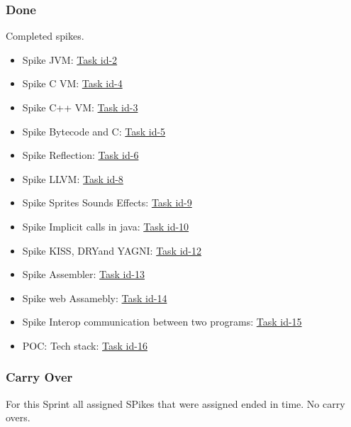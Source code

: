 \documentclass[a4paper,12pt]{article}
\begin{document}
\subsubsection{Done}
Completed spikes.
\begin{itemize}
    \item Spike JVM: \href{https://tree.taiga.io/project/joseluis-teran-coffeetime/us/2?milestone=390348}{Task id-2}
    \item Spike C VM: \href{https://tree.taiga.io/project/joseluis-teran-coffeetime/us/4?milestone=390348}{Task id-4}
    \item Spike C++ VM: \href{https://tree.taiga.io/project/joseluis-teran-coffeetime/us/3?milestone=390348}{Task id-3}
    \item Spike Bytecode and C: \href{https://tree.taiga.io/project/joseluis-teran-coffeetime/us/5?milestone=390348}{Task id-5}
    \item Spike Reflection: \href{https://tree.taiga.io/project/joseluis-teran-coffeetime/us/6?milestone=390348}{Task id-6}
    \item Spike LLVM: \href{https://tree.taiga.io/project/joseluis-teran-coffeetime/us/8?milestone=390348}{Task id-8}
    \item Spike Sprites Sounds Effects: \href{https://tree.taiga.io/project/joseluis-teran-coffeetime/us/9?milestone=390348}{Task id-9}
    \item Spike Implicit calls in java: \href{https://tree.taiga.io/project/joseluis-teran-coffeetime/us/10?milestone=390348}{Task id-10}
    \item Spike KISS, DRYand YAGNI: \href{https://tree.taiga.io/project/joseluis-teran-coffeetime/us/12?milestone=390348}{Task id-12}
    \item Spike Assembler: \href{https://tree.taiga.io/project/joseluis-teran-coffeetime/us/13?milestone=390348}{Task id-13}
    \item Spike web Assamebly: \href{https://tree.taiga.io/project/joseluis-teran-coffeetime/us/14?milestone=390348}{Task id-14}
    \item Spike Interop communication between two programs: \href{https://tree.taiga.io/project/joseluis-teran-coffeetime/us/15?milestone=390348}{Task id-15}
    \item POC: Tech stack: \href{https://tree.taiga.io/project/joseluis-teran-coffeetime/us/16?milestone=390348}{Task id-16}
\end{itemize}

\subsubsection{Carry Over}
For this Sprint all assigned SPikes that were assigned ended in time. No carry overs.
\end{document}
